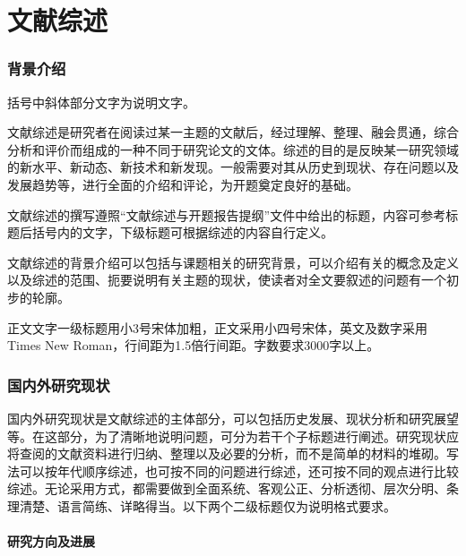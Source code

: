 \part{文献综述} %
\label{prt:文献综述_}
	\setcounter{section}{0}
	\section{背景介绍} %
	\label{sec:背景介绍}
		括号中斜体部分文字为说明文字。

		文献综述是研究者在阅读过某一主题的文献后，经过理解、整理、融会贯通，综合分析和评价而组成的一种不同于研究论文的文体。综述的目的是反映某一研究领域的新水平、新动态、新技术和新发现。一般需要对其从历史到现状、存在问题以及发展趋势等，进行全面的介绍和评论，为开题奠定良好的基础。

		文献综述的撰写遵照“文献综述与开题报告提纲”文件中给出的标题，内容可参考标题后括号内的文字，下级标题可根据综述的内容自行定义。

		文献综述的背景介绍可以包括与课题相关的研究背景，可以介绍有关的概念及定义以及综述的范围、扼要说明有关主题的现状，使读者对全文要叙述的问题有一个初步的轮廓。

		正文文字一级标题用小3号宋体加粗，正文采用小四号宋体，英文及数字采用Times New Roman，行间距为1.5倍行间距。字数要求3000字以上。
	\newpage
	\section{国内外研究现状} %
	\label{sec:国内外研究现状}
		国内外研究现状是文献综述的主体部分，可以包括历史发展、现状分析和研究展望等。在这部分，为了清晰地说明问题，可分为若干个子标题进行阐述。研究现状应将查阅的文献资料进行归纳、整理以及必要的分析，而不是简单的材料的堆砌。写法可以按年代顺序综述，也可按不同的问题进行综述，还可按不同的观点进行比较综述。无论采用方式，都需要做到全面系统、客观公正、分析透彻、层次分明、条理清楚、语言简练、详略得当。以下两个二级标题仅为说明格式要求。

		\subsection{研究方向及进展} %
		\label{sub:研究方向及进展}
		
